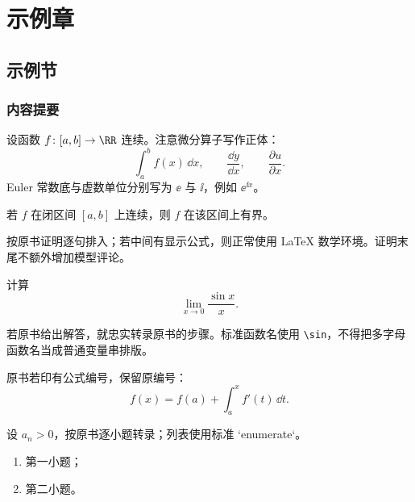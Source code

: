 
\chapter{示例章}

\section{示例节}

\subsection{内容提要}
设函数 $f\colon [a,b]\to\RR$ 连续。注意微分算子写作正体：
\[
  \int_a^b f(x)\,\dd x,
  \qquad
  \frac{\dd y}{\dd x},
  \qquad
  \frac{\partial u}{\partial x}.
\]
Euler 常数底与虚数单位分别写为 $\ee$ 与 $\ii$，例如 $\ee^{\ii x}$。

\begin{xtheorem}[1.2.1]
若 $f$ 在闭区间 $[a,b]$ 上连续，则 $f$ 在该区间上有界。
\end{xtheorem}

\begin{xproof}
按原书证明逐句排入；若中间有显示公式，则正常使用 LaTeX 数学环境。证明末尾不额外增加模型评论。
\end{xproof}

\begin{xexample}[1.2.2]
计算
\[
  \lim_{x\to0}\frac{\sin x}{x}.
\]
\end{xexample}
\begin{xsolution}
若原书给出解答，就忠实转录原书的步骤。标准函数名使用 \verb|\sin|，不得把多字母函数名当成普通变量串排版。
\end{xsolution}

原书若印有公式编号，保留原编号：
\begin{equation}
  f(x)=f(a)+\int_a^x f'(t)\,\dd t.
  \tag{1.8}
  \label{eq:1.8}
\end{equation}

\begin{xexercise}
设 $a_n>0$，按原书逐小题转录；列表使用标准 `enumerate`。
\begin{enumerate}[label=(\arabic*)]
  \item 第一小题；
  \item 第二小题。
\end{enumerate}
\end{xexercise}

